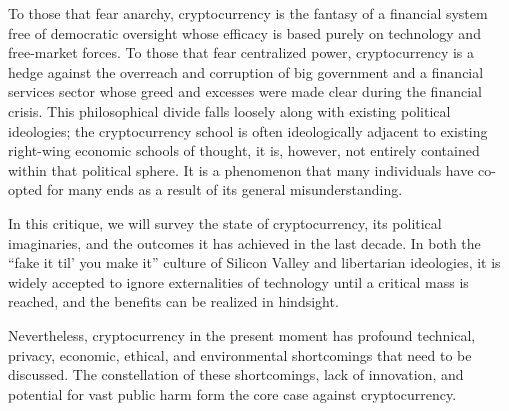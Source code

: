 To those that fear anarchy, cryptocurrency is the fantasy of a financial system
free of democratic oversight whose efficacy is based purely on technology and
free-market forces. To those that fear centralized power, cryptocurrency is a
hedge against the overreach and corruption of big government and a financial
services sector whose greed and excesses were made clear during the financial
crisis. This philosophical divide falls loosely along with existing political
ideologies; the cryptocurrency school is often ideologically adjacent to
existing right-wing economic schools of thought, it is, however, not entirely
contained within that political sphere. It is a phenomenon that many individuals
have co-opted for many ends as a result of its general misunderstanding.

In this critique, we will survey the state of cryptocurrency, its political
imaginaries, and the outcomes it has achieved in the last decade.  In both the
``fake it til' you make it'' culture of Silicon Valley and libertarian
ideologies, it is widely accepted to ignore externalities of technology until a
critical mass is reached, and the benefits can be realized in hindsight.

Nevertheless, cryptocurrency in the present moment has profound technical,
privacy, economic, ethical, and environmental shortcomings that need to be
discussed. The constellation of these shortcomings, lack of innovation, and
potential for vast public harm form the core case against cryptocurrency.

